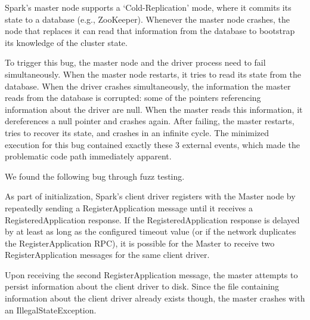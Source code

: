 
 Spark's
master node supports a `Cold-Replication' mode, where it commits its state to
a database (e.g., ZooKeeper). Whenever the master node crashes, the node that
replaces it can read that information from the database to bootstrap its
knowledge of the cluster state.

To trigger this bug, the master node and the driver process need to fail
simultaneously. When the master node restarts, it tries to read its state from
the database. When the driver crashes simultaneously, the
information the master reads from the database is corrupted: some of
the pointers referencing information about the driver are null. When the
master reads this information, it dereferences a null pointer and crashes
again. After failing, the master restarts, tries to recover its state, and
crashes in an infinite cycle. The minimized execution for this bug contained
exactly these 3 external events, which made the problematic code path immediately apparent.

 We found the
following bug through fuzz testing.

As part of
initialization, Spark's client driver registers with the Master node by repeatedly sending a RegisterApplication
  message until it receives a RegisteredApplication response.
 If the RegisteredApplication response is delayed by at least as long as the
 configured timeout value (or if the network
  duplicates the RegisterApplication RPC), it is possible for the Master to receive two RegisterApplication
  messages for the same client driver.

Upon receiving the second RegisterApplication message, the master attempts to
persist information about the client driver
to disk. Since the file containing information about the client driver already exists though, the master crashes with an
IllegalStateException.

